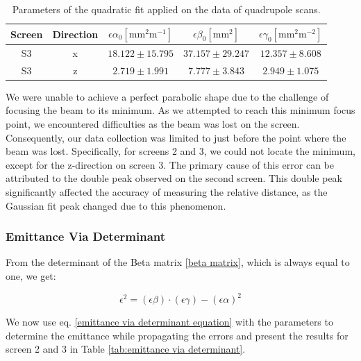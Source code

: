 \documentclass[12pt]{article}
\begin{document}
\begin{table}[H]
    \centering
    \begin{tabular}{c|c|c|c|c}
        \hline
        \hline
        Screen & Direction & $\epsilon \alpha_0$$\mathrm{[mm^2m^{-1}]}$ & $\epsilon \beta_0$$\mathrm{[mm^2]}$ &$\epsilon \gamma_0$$\mathrm{[mm^2m^{-2}]}$ \\ 
        \hline

        S3 & x & $18.122 \pm 15.795$ & $37.157 \pm 29.247$ & $12.357 \pm 8.608$ \\ 
        S3 & z & $2.719 \pm 1.991$ & $7.777 \pm 3.843$ & $2.949 \pm 1.075$ \\ 
        
        \hline
    \end{tabular}
    \caption{Parameters of the quadratic fit applied on the data of quadrupole
scans.}
    \label{tab6}
\end{table}

We were unable to achieve a perfect parabolic shape due to the challenge of focusing the beam to its minimum. As we attempted to reach this minimum focus point, we encountered difficulties as the beam was lost on the screen. Consequently, our data collection was limited to just before the point where the beam was lost. Specifically, for screens 2 and 3, we could not locate the minimum, except for the z-direction on screen 3. The primary cause of this error can be attributed to the double peak observed on the second screen. This double peak significantly affected the accuracy of measuring the relative distance, as the Gaussian fit peak changed due to this phenomenon. 


\subsubsection*{Emittance Via Determinant}

From the determinant of the Beta matrix \ref{beta matrix}, which is always equal to one, we get:

\begin{equation}
\epsilon^2=(\epsilon \beta) \cdot(\epsilon \gamma)-(\epsilon \alpha)^2
\label{emittance via determinant equation}
\end{equation}

We now use eq. \ref{emittance via determinant equation} with the parameters to determine the emittance while propagating the errors and present the results for screen 2 and 3 in Table \ref{tab:emittance via determinant}.
\end{document}
